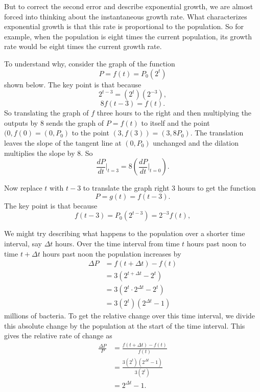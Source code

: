 \documentclass{ximera}
\begin{document}
But to correct the second error and describe exponential growth, we are almost forced into thinking about the instantaneous growth rate. What characterizes exponential growth is that this rate is proportional to the population. So for example, when the population is eight times the current population, its growth rate would be eight times the current growth rate.

To understand why, consider the graph of the function
\[
     P = f(t)  = P_0 (2^t) 
\]
shown below. The key point is that because
\[
 2^{t-3} = (2^t)(2^{-3}) , 
\]
\[
      8 f(t-3) = f(t).
\]
So translating the graph of $f$ three hours to the right and then multiplying the outputs by $8$ sends the graph of $P=f(t)$ to itself and the point $(0,f(0) = (0,P_0)$ to the point $(3,f(3)) = (3,8P_0)$. The translation leaves the slope of the tangent line at $(0,P_0)$ unchanged and the dilation multiplies the slope by $8$. So
\[
  \frac{dP}{dt}\Big|_{t=3} = 8 \left( \frac{dP}{dt}\Big|_{t=0} \right).
\]


Now replace $t$ with $t-3$ to translate the graph right $3$ hours to get the function
\[
  P = g(t) = f(t-3) .
\]
The key point is that because
\[
     f(t-3) = P_0 (2^{t-3}) = 2^{-3} f(t), 
\]



We might try describing what happens to the population over a shorter time interval, say $\Delta t$ hours. Over the time interval from time $t$ hours past noon to time $t+\Delta t$ hours past noon the population increases by 
\begin{align*}
  \Delta P &=  f(t + \Delta t) - f(t)  \\ 
                               &=  3 (2^{t+\Delta t} - 2^t) \\
                               &=  3 (2^t \cdot 2^{\Delta t} - 2^t) \\
                               &=  3 (2^t) (2^{\Delta t} - 1) 
\end{align*}
millions of bacteria. To get the relative change over this time interval, we divide this absolute change by the population at the start of the time interval. This gives the relative rate of change as
\begin{align*}
   \frac{\Delta P}{P} &=  \frac{f(t + \Delta t) - f(t)}{f(t)}  \\ 
                              &= \frac{3 (2^t) (2^{\Delta t} - 1)}{3 (2^t)} \\
                              &= 2^{\Delta t} - 1.
\end{align*}
\end{document}
